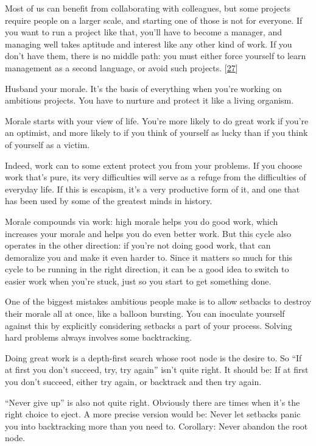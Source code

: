 Most of us can benefit from collaborating with colleagues, but some
projects require people on a larger scale, and starting one of those is
not for everyone. If you want to run a project like that, you'll have to
become a manager, and managing well takes aptitude and interest like any
other kind of work. If you don't have them, there is no middle path: you
must either force yourself to learn management as a second language, or
avoid such projects. {[}\hyperref[f27n]{27}{]}

Husband your morale. It's the basis of everything when you're working on
ambitious projects. You have to nurture and protect it like a living
organism.

Morale starts with your view of life. You're more likely to do great
work if you're an optimist, and more likely to if you think of yourself
as lucky than if you think of yourself as a victim.

Indeed, work can to some extent protect you from your problems. If you
choose work that's pure, its very difficulties will serve as a refuge
from the difficulties of everyday life. If this is escapism, it's a very
productive form of it, and one that has been used by some of the
greatest minds in history.

Morale compounds via work: high morale helps you do good work, which
increases your morale and helps you do even better work. But this cycle
also operates in the other direction: if you're not doing good work,
that can demoralize you and make it even harder to. Since it matters so
much for this cycle to be running in the right direction, it can be a
good idea to switch to easier work when you're stuck, just so you start
to get something done.

One of the biggest mistakes ambitious people make is to allow setbacks
to destroy their morale all at once, like a balloon bursting. You can
inoculate yourself against this by explicitly considering setbacks a
part of your process. Solving hard problems always involves some
backtracking.

Doing great work is a depth-first search whose root node is the desire
to. So ``If at first you don't succeed, try, try again'' isn't quite
right. It should be: If at first you don't succeed, either try again, or
backtrack and then try again.

``Never give up'' is also not quite right. Obviously there are times
when it's the right choice to eject. A more precise version would be:
Never let setbacks panic you into backtracking more than you need to.
Corollary: Never abandon the root node.

